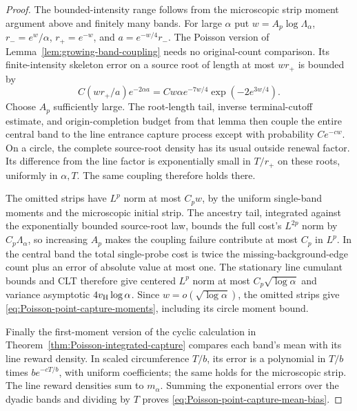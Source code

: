 \documentclass[11pt,letterpaper]{article}
\begin{document}
\begin{proof}
The bounded-intensity range follows from the microscopic
strip moment argument above and finitely many bands.
For large $\alpha$ put $w=A_p\log\Lambda_\alpha$,
$r_-=e^w/\alpha$, $r_+=e^{-w}$, and
$a=e^{-w/4}r_-$. The Poisson version of
Lemma~\ref{lem:growing-band-coupling} needs no original-count
comparison. Its finite-intensity skeleton error on a source
root of length at most $wr_+$ is bounded by
\[
 C(wr_+/a)e^{-2\alpha a}
   =Cw\alpha e^{-7w/4}\exp(-2e^{3w/4}).
\]
Choose $A_p$ sufficiently large. The root-length tail, inverse
terminal-cutoff estimate, and origin-completion budget from
that lemma then couple the entire central band to the line
entrance capture process except with probability $Ce^{-cw}$.
On a circle, the complete source-root density has its usual
outside renewal factor. Its difference from the line factor
is exponentially small in $T/r_+$ on these roots, uniformly
in $\alpha,T$. The same coupling therefore holds there.

The omitted strips have $L^p$ norm at most $C_pw$, by the
uniform single-band moments and the microscopic initial strip.
The ancestry tail, integrated against the exponentially
bounded source-root law, bounds the full cost's $L^{2p}$ norm
by $C_p\Lambda_\alpha$, so increasing $A_p$ makes the coupling
failure contribute at most $C_p$ in $L^p$.
In the central band the total single-probe cost is twice
the missing-background-edge count plus an error of absolute
value at most one. The stationary line cumulant bounds and
CLT therefore give centered $L^p$ norm at most
$C_p\sqrt{\log\alpha}$ and variance asymptotic
$4v_{\rm H}\log\alpha$. Since $w=o(\sqrt{\log\alpha})$,
the omitted strips give \eqref{eq:Poisson-point-capture-moments},
including its circle moment bound.

Finally the first-moment version of the cyclic calculation
in Theorem~\ref{thm:Poisson-integrated-capture} compares each
band's mean with its line reward density. In scaled
circumference $T/b$, its error is a polynomial in $T/b$
times $b e^{-cT/b}$, with uniform coefficients; the same
holds for the microscopic strip. The line reward densities
sum to $m_\alpha$. Summing the exponential errors over the
dyadic bands and dividing by $T$ proves
\eqref{eq:Poisson-point-capture-mean-bias}.
\end{proof}
\end{document}
